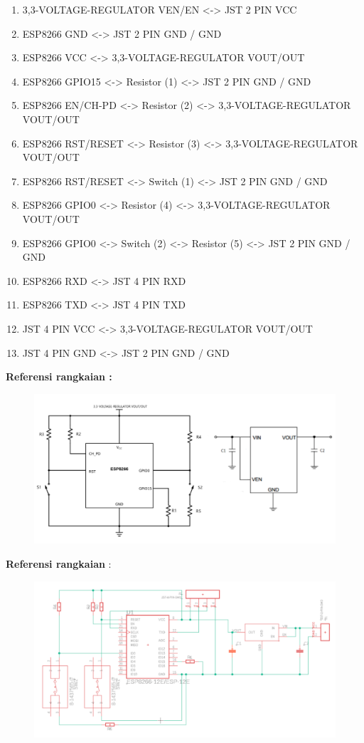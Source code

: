 \begin{enumerate}
\begin{enumerate}
        \item 3,3-VOLTAGE-REGULATOR VEN/EN <-> JST 2 PIN VCC
        \item ESP8266 GND <-> JST 2 PIN GND / GND
        \item ESP8266 VCC <-> 3,3-VOLTAGE-REGULATOR VOUT/OUT
        \item ESP8266 GPIO15 <-> Resistor (1) <-> JST 2 PIN GND / GND
        \item ESP8266 EN/CH-PD <-> Resistor (2) <-> 3,3-VOLTAGE-REGULATOR VOUT/OUT
        \item ESP8266 RST/RESET <-> Resistor (3) <-> 3,3-VOLTAGE-REGULATOR VOUT/OUT
        \item ESP8266 RST/RESET <-> Switch (1) <-> JST 2 PIN GND / GND
        \item ESP8266 GPIO0 <-> Resistor (4) <-> 3,3-VOLTAGE-REGULATOR VOUT/OUT
        \item ESP8266 GPIO0 <-> Switch (2) <-> Resistor (5) <-> JST 2 PIN GND / GND
        \item ESP8266 RXD <-> JST 4 PIN RXD
        \item ESP8266 TXD <-> JST 4 PIN TXD
        \item JST 4 PIN VCC <-> 3,3-VOLTAGE-REGULATOR VOUT/OUT
        \item JST 4 PIN GND <-> JST 2 PIN GND / GND
    \end{enumerate}
\end{enumerate}
\clearpage
\textbf{Referensi rangkaian :}
\begin{figure}[H]
    \centering
    \includegraphics[width=0.8\linewidth]{P1/img/referensi.png}
\end{figure}

\textbf{Referensi rangkaian} :
\begin{figure}[H]
    \centering
    \includegraphics[width=1.1\linewidth]{P1/img/hasiljadischematic.png}
\end{figure}

